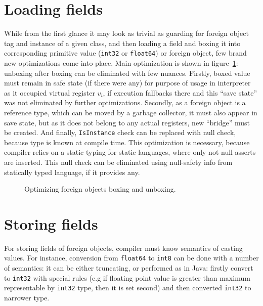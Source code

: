 \documentclass[times, %
               specification,annotation, %
               titlepage-extra-ru,specification-extra-ru,annotation-extra-ru, %
               languages={russian,english} %
              ]{itmo-student-thesis}
\begin{document}
\section{Loading fields}
While from the first glance it may look as trivial as guarding for foreign object tag and instance of a given class, and then loading a field and boxing it into corresponding primitive value (\texttt{int32} or \texttt{float64}) or foreign object, few brand new optimizations come into place. Main optimization is shown in figure~\ref{fig:field-opt}: unboxing after boxing can be eliminated with few nuances. Firstly, boxed value must remain in safe state (if there were any) for purpose of usage in interpreter as it occupied virtual register $v_i$, if execution fallbacks there and this ``save state'' was not eliminated by further optimizations. Secondly, as a foreign object is a reference type, which can be moved by a garbage collector, it must also appear in save state, but as it does not belong to any actual registers, new ``bridge'' must be created. And finally, \texttt{IsInstance} check can be replaced with null check, because type is known at compile time. This optimization is necessary, because compiler relies on a static typing for static languages, where only not-null asserts are inserted. This null check can be eliminated using null-safety info from statically typed language, if it provides any.
\begin{figure}[H]
    \caption{Optimizing foreign objects boxing and unboxing.}\label{fig:field-opt}
    \centering
    \end{figure}

\section{Storing fields}
For storing fields of foreign objects, compiler must know semantics of casting values. For instance, conversion from \texttt{float64} to \texttt{int8} can be done with a number of semantics: it can be either truncating, or performed as in Java: firstly convert to \texttt{int32} with special rules (e.g if floating point value is greater than maximum representable by \texttt{int32} type, then it is set second) and then converted \texttt{int32} to narrower type.
\end{document}
